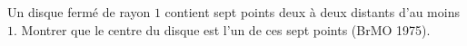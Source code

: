 Un disque fermé de rayon $1$ contient sept points deux à deux distants d'au moins $1$. Montrer que le centre du disque est l'un de ces sept points (BrMO 1975).
